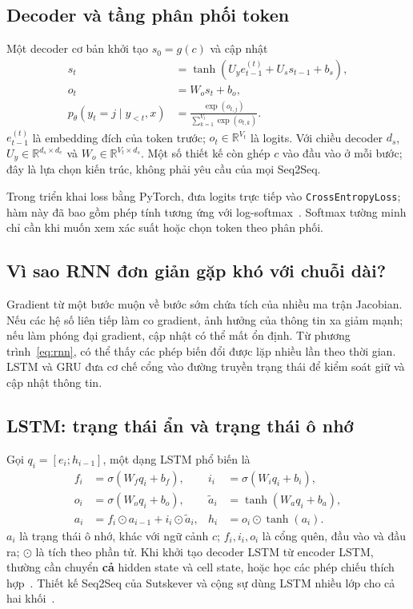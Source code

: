 \documentclass[11pt,a4paper]{article}
\numberwithin{equation}{section}
\newcommand{\R}{\mathbb{R}}
\begin{document}
\subsection{Decoder và tầng phân phối token}
Một decoder cơ bản khởi tạo $s_0=g(c)$ và cập nhật
\begin{align}
s_t&=\tanh(U_ye^{(t)}_{t-1}+U_ss_{t-1}+b_s),\\
o_t&=W_os_t+b_o,\\
p_\theta(y_t=j\mid y_{<t},x)&=\frac{\exp(o_{t,j})}{\sum_{k=1}^{V_t}\exp(o_{t,k})}.
\end{align}
$e^{(t)}_{t-1}$ là embedding đích của token trước; $o_t\in\R^{V_t}$ là logits. Với chiều decoder $d_s$, $U_y\in\R^{d_s\times d_e}$ và $W_o\in\R^{V_t\times d_s}$. Một số thiết kế còn ghép $c$ vào đầu vào ở mỗi bước; đây là lựa chọn kiến trúc, không phải yêu cầu của mọi Seq2Seq.

Trong triển khai loss bằng PyTorch, đưa logits trực tiếp vào \texttt{CrossEntropyLoss}; hàm này đã bao gồm phép tính tương ứng với log-softmax~\cite{torchce}. Softmax tường minh chỉ cần khi muốn xem xác suất hoặc chọn token theo phân phối.

\subsection{Vì sao RNN đơn giản gặp khó với chuỗi dài?}
Gradient từ một bước muộn về bước sớm chứa tích của nhiều ma trận Jacobian. Nếu các hệ số liên tiếp làm co gradient, ảnh hưởng của thông tin xa giảm mạnh; nếu làm phóng đại gradient, cập nhật có thể mất ổn định. Từ phương trình~\eqref{eq:rnn}, có thể thấy các phép biến đổi được lặp nhiều lần theo thời gian. LSTM và GRU đưa cơ chế cổng vào đường truyền trạng thái để kiểm soát giữ và cập nhật thông tin.

\subsection{LSTM: trạng thái ẩn và trạng thái ô nhớ}
Gọi $q_i=[e_i;h_{i-1}]$, một dạng LSTM phổ biến là
\begin{align}
f_i&=\sigma(W_fq_i+b_f), & i_i&=\sigma(W_iq_i+b_i),\\
o_i&=\sigma(W_oq_i+b_o), & \tilde a_i&=\tanh(W_aq_i+b_a),\\
a_i&=f_i\odot a_{i-1}+i_i\odot\tilde a_i, & h_i&=o_i\odot\tanh(a_i).
\end{align}
$a_i$ là trạng thái ô nhớ, khác với ngữ cảnh $c$; $f_i,i_i,o_i$ là cổng quên, đầu vào và đầu ra; $\odot$ là tích theo phần tử. Khi khởi tạo decoder LSTM từ encoder LSTM, thường cần chuyển \textbf{cả} hidden state và cell state, hoặc học các phép chiếu thích hợp~\cite{d2llstm}. Thiết kế Seq2Seq của Sutskever và cộng sự dùng LSTM nhiều lớp cho cả hai khối~\cite{sutskever}.
\end{document}
